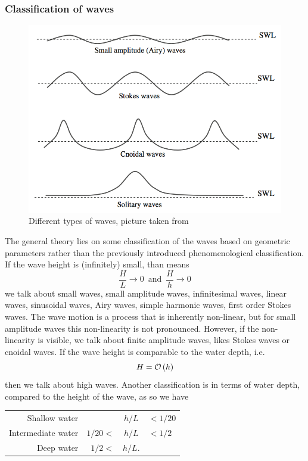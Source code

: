\subsubsection*{Classification of waves}
\begin{figure}[b]
\centering
\includegraphics[scale=0.25]{./SurfWaves_figs/Type_of_waves.png}
\caption{Different types of waves, picture taken from}
\end{figure}
The general theory lies on some classification of the waves based on geometric parameters rather than the previously introduced phenomenological classification. If the wave height is (infinitely) small, than means
\begin{equation}
\dfrac{H}{L}	\rightarrow 0 \, \text{ and } \, \dfrac{H}{h}\rightarrow 0
\end{equation}
we talk about small waves, small amplitude waves, infinitesimal waves, linear waves, sinusoidal waves, Airy waves, simple harmonic waves, first order Stokes waves. The wave motion is a process that is inherently non-linear, but for small amplitude waves this non-linearity is not pronounced. However, if the non-linearity is visible, we talk about finite amplitude waves, likes Stokes waves or cnoidal waves. If the wave height is comparable to the water depth, i.e.
\begin{equation}
H=\mathcal{O}\left( h \right)
\end{equation}
then we talk about high waves. Another classification is in terms of water depth, compared to the height of the wave, as so we have
\begin{center}
\begin{tabular}{ r r c l }
Shallow water &   & $h/L$ & $<1/20$ \\ 
Intermediate water & $1/20<$ & $h/L$ & $<1/2$ \\  
Deep water & $1/2 <$ & $h/L$. &      
\end{tabular}
\end{center}
